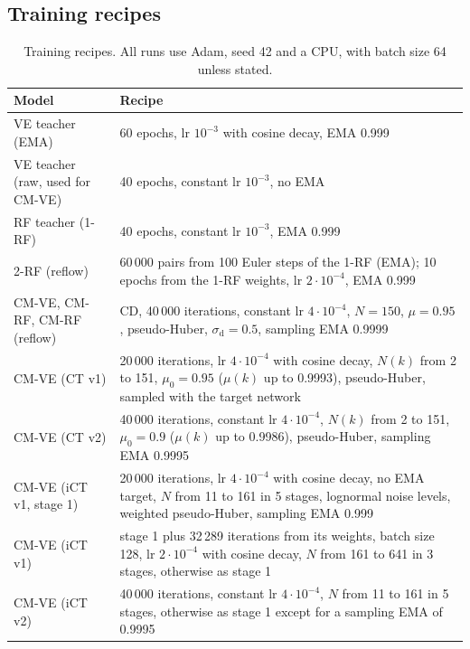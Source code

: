 \documentclass{article}
\begin{document}
\subsection{Training recipes}
\label{sec:app_recipes}

\begin{table}[H]
  \caption{Training recipes. All runs use Adam, seed 42 and a CPU, with batch
  size 64 unless stated.}
  \label{tab:recipes}
  \centering
  \footnotesize
  \begin{tabular}{p{3.4cm}p{8.9cm}}
    \toprule
    Model & Recipe \\
    \midrule
    VE teacher (EMA) & 60 epochs, lr $10^{-3}$ with cosine decay, EMA 0.999 \\
    VE teacher (raw, used for CM-VE) & 40 epochs, constant lr $10^{-3}$, no EMA \\
    RF teacher (1-RF) & 40 epochs, constant lr $10^{-3}$, EMA 0.999 \\
    2-RF (reflow) & 60\,000 pairs from 100 Euler steps of the 1-RF (EMA); 10 epochs from the 1-RF weights, lr $2\cdot10^{-4}$, EMA 0.999 \\
    CM-VE, CM-RF, CM-RF (reflow) & CD, 40\,000 iterations, constant lr $4\cdot10^{-4}$, $N = 150$, $\mu = 0.95$, pseudo-Huber, $\sigma_\text{d} = 0.5$, sampling EMA 0.9999 \\
    CM-VE (CT v1) & 20\,000 iterations, lr $4\cdot10^{-4}$ with cosine decay, $N(k)$ from 2 to 151, $\mu_0 = 0.95$ ($\mu(k)$ up to 0.9993), pseudo-Huber, sampled with the target network \\
    CM-VE (CT v2) & 40\,000 iterations, constant lr $4\cdot10^{-4}$, $N(k)$ from 2 to 151, $\mu_0 = 0.9$ ($\mu(k)$ up to 0.9986), pseudo-Huber, sampling EMA 0.9995 \\
    CM-VE (iCT v1, stage 1) & 20\,000 iterations, lr $4\cdot10^{-4}$ with cosine decay, no EMA target, $N$ from 11 to 161 in 5 stages, lognormal noise levels, weighted pseudo-Huber, sampling EMA 0.999 \\
    CM-VE (iCT v1) & stage 1 plus 32\,289 iterations from its weights, batch size 128, lr $2\cdot10^{-4}$ with cosine decay, $N$ from 161 to 641 in 3 stages, otherwise as stage 1 \\
    CM-VE (iCT v2) & 40\,000 iterations, constant lr $4\cdot10^{-4}$, $N$ from 11 to 161 in 5 stages, otherwise as stage 1 except for a sampling EMA of 0.9995 \\
    \bottomrule
  \end{tabular}
\end{table}
\end{document}
